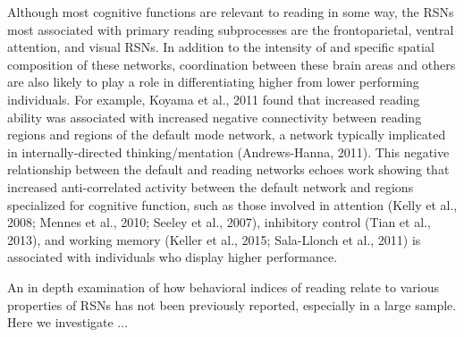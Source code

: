 Although most cognitive functions are relevant to reading in some way, the RSNs most associated with primary reading subprocesses are the frontoparietal, ventral attention, and visual RSNs.  In addition to the intensity of and specific spatial composition of these networks, coordination between these brain areas and others are also likely to play a role in differentiating higher from lower performing individuals. For example, Koyama et al., 2011 found that increased reading ability was associated with increased negative connectivity between reading regions and regions of the default mode network, a network typically implicated in internally-directed thinking/mentation (Andrews-Hanna, 2011). This negative relationship between the default and reading networks echoes work showing that increased anti-correlated activity between the default network and regions specialized for cognitive function, such as those involved in attention (Kelly et al., 2008; Mennes et al., 2010; Seeley et al., 2007), inhibitory control (Tian et al., 2013), and working memory (Keller et al., 2015; Sala-Llonch et al., 2011) is associated with individuals who display higher performance.

An in depth examination of how behavioral indices of reading relate to various properties of RSNs has not been previously reported, especially in a large sample. Here we investigate ...






